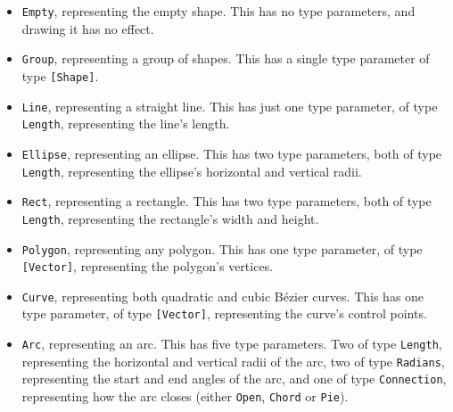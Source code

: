 \documentclass[../main.tex]{subfiles}
\begin{document}
                \begin{itemize}
                    \item \texttt{Empty}, representing the empty shape.
                          This has no type parameters, and drawing it has no effect.
                    \item \texttt{Group}, representing a group of shapes.
                          This has a single type parameter of type \texttt{[Shape]}.
                    \item \texttt{Line}, representing a straight line.
                          This has just one type parameter, of type \texttt{Length}, representing the
                              line's length.
                    \item \texttt{Ellipse}, representing an ellipse.
                          This has two type parameters, both of type \texttt{Length}, representing the
                              ellipse's horizontal and vertical radii.
                    \item \texttt{Rect}, representing a rectangle.
                          This has two type parameters, both of type \texttt{Length}, representing the
                              rectangle's width and height.
                    \item \texttt{Polygon}, representing any polygon.
                          This has one type parameter, of type \texttt{[Vector]}, representing the
                              polygon's vertices.
                    \item \texttt{Curve}, representing both quadratic and cubic Bézier curves.
                          This has one type parameter, of type \texttt{[Vector]}, representing the
                              curve's control points.
                    \item \texttt{Arc}, representing an arc.
                          This has five type parameters.
                          Two of type \texttt{Length}, representing the horizontal and vertical radii of
                              the arc, two of type \texttt{Radians}, representing the start and end angles of
                              the arc, and one of type \texttt{Connection}, representing how the arc closes
                              (either \texttt{Open}, \texttt{Chord} or \texttt{Pie}).
                \end{itemize}
\end{document}
